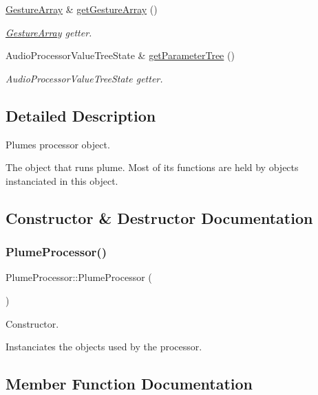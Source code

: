 \begin{DoxyCompactItemize}
\mbox{\hyperlink{class_gesture_array}{Gesture\+Array}} \& \mbox{\hyperlink{class_plume_processor_a691a2f342167e257fabf74d0bb76a563}{get\+Gesture\+Array}} ()
\begin{DoxyCompactList}\small\item\em \mbox{\hyperlink{class_gesture_array}{Gesture\+Array}} getter. \end{DoxyCompactList}\item 
Audio\+Processor\+Value\+Tree\+State \& \mbox{\hyperlink{class_plume_processor_a644209f6f5ffcd173b09cc897932bba2}{get\+Parameter\+Tree}} ()
\begin{DoxyCompactList}\small\item\em Audio\+Processor\+Value\+Tree\+State getter. \end{DoxyCompactList}\end{DoxyCompactItemize}


\subsection{Detailed Description}
Plume\textquotesingle{}s processor object. 

The object that runs plume. Most of it\textquotesingle{}s functions are held by objects instanciated in this object. 

\subsection{Constructor \& Destructor Documentation}
\mbox{\label{class_plume_processor_a1462b7f98f4677da0dab2d98dd8da1e1}} 
\subsubsection{\texorpdfstring{Plume\+Processor()}{PlumeProcessor()}}
{\footnotesize\ttfamily Plume\+Processor\+::\+Plume\+Processor (\begin{DoxyParamCaption}{ }\end{DoxyParamCaption})}



Constructor. 

Instanciates the objects used by the processor. 

\subsection{Member Function Documentation}
\mbox{\label{class_plume_processor_ab24c4b6857ca26d462fce6be9e23cedd}} 
